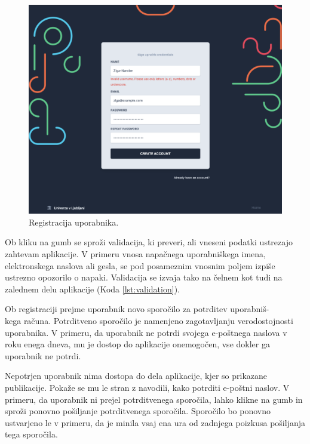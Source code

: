 \begin{figure}[h]
\begin{center}
\includegraphics[width=1\textwidth]{slike/signup-validation.png}
\end{center}
\caption{ Registracija uporabnika. }
\label{signup-form}
\end{figure}

Ob kliku na gumb  se sproži validacija, ki preveri, ali vneseni podatki ustrezajo zahtevam aplikacije. V primeru vnosa napačnega uporabniškega imena, elektronskega naslova ali gesla, se pod posameznim vnosnim poljem izpiše ustrezno opozorilo o napaki. Validacija se izvaja tako na čelnem kot tudi na zalednem delu aplikacije (Koda \ref{lst:validation}).

Ob registraciji prejme uporabnik novo sporočilo za potrditev uporabniš-\\kega računa. Potrditveno sporočilo je namenjeno zagotavljanju verodostojnosti uporabnika. V primeru, da uporabnik ne potrdi svojega e-poštnega naslova v roku enega dneva, mu je dostop do aplikacije onemogočen, vse dokler ga uporabnik ne potrdi.

Nepotrjen uporabnik nima dostopa do dela aplikacije, kjer so prikazane publikacije. Pokaže se mu le stran z navodili, kako potrditi e-poštni naslov. V primeru, da uporabnik ni prejel potrditvenega sporočila, lahko klikne na gumb in sproži ponovno pošiljanje potrditvenega sporočila. Sporočilo bo ponovno ustvarjeno le v primeru, da je minila vsaj ena ura od zadnjega poizkusa pošiljanja tega sporočila.

